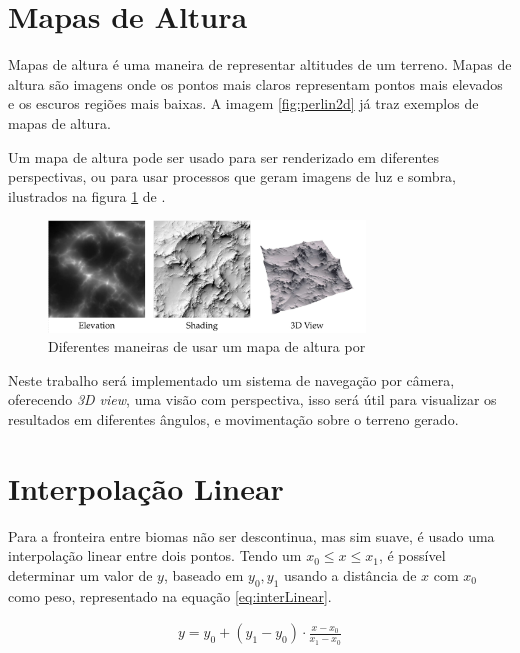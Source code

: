 \section{Mapas de Altura}
Mapas de altura é uma maneira de representar altitudes de um terreno. Mapas de altura são imagens
onde os pontos mais claros representam pontos mais elevados e os escuros regiões mais baixas.
A imagem \ref{fig:perlin2d} já traz exemplos de mapas de altura.

Um mapa de altura pode ser usado para ser renderizado em diferentes perspectivas,
ou para usar processos que geram imagens de luz e sombra, ilustrados na figura \ref{fig:hmap} de \cite{dachsbacher2006interactive}.
\begin{figure}[H]
    \centering
    \includegraphics[width=0.75\textwidth]{figuras/hmap.png}
    \caption{Diferentes maneiras de usar um mapa de altura por \cite{dachsbacher2006interactive}}
    \label{fig:hmap}
\end{figure}

Neste trabalho será implementado um sistema de navegação por câmera, oferecendo \textit{3D view}, 
uma visão com perspectiva, isso será útil para visualizar os resultados em diferentes
ângulos, e movimentação sobre o terreno gerado.

\section{Interpolação Linear}

Para a fronteira entre biomas não ser descontinua, mas sim suave, é usado uma interpolação linear entre dois pontos.
Tendo um $x_{0} \leq x \leq x_{1}$, é possível determinar um valor de $y$, baseado em $y_{0}, y_{1}$ usando a distância
de $x$ com $x_{0}$ como peso, representado na equação \ref{eq:interLinear}.

\begin{equation}\label{eq:interLinear}
  \begin{split}
    y = y_{0} + (y_{1} - y_{0}) \cdot \frac{x - x_{0}}{x_{1} - x_{0}}
  \end{split}
\end{equation}

